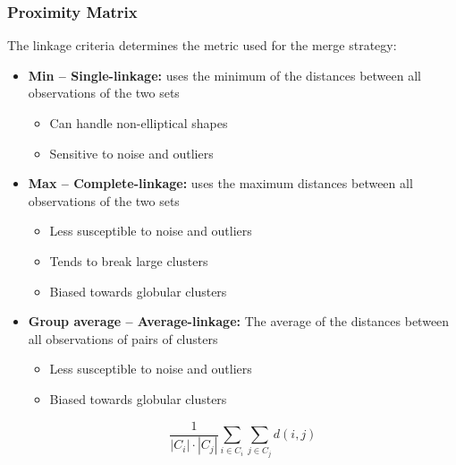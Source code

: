 \documentclass[aspectratio=169, 10pt]{beamer}
\begin{document}
\begin{frame}
    \frametitle{Proximity Matrix}

    The linkage criteria determines the metric used for the merge strategy:

    \begin{itemize}
        \item \textbf{Min -- Single-linkage:} uses the minimum of the distances between all observations of the two sets
            \begin{itemize}
                \item Can handle non-elliptical shapes
                \item Sensitive to noise and outliers
            \end{itemize}
        \item \textbf{Max -- Complete-linkage:} uses the maximum distances between all observations of the two sets
            \begin{itemize}
                \item Less susceptible to noise and outliers
                \item Tends to break large clusters
                \item Biased towards globular clusters
            \end{itemize}
        \item \textbf{Group average -- Average-linkage:} The average of the distances between all observations of pairs of clusters
            \begin{itemize}
                \item Less susceptible to noise and outliers
                \item Biased towards globular clusters
            \end{itemize}
            \begin{equation*}
                \frac{1}{|C_i| \cdot |C_j|} \sum_{i \in C_i} \sum_{j \in C_j} d(i, j)
            \end{equation*}
    \end{itemize}
    
\end{frame}
\end{document}
